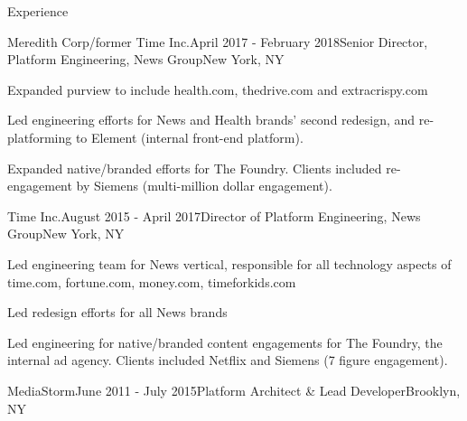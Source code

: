 \documentclass{resume} %
\begin{document}

\begin{rSection}{Experience}

\begin{rSubsection}{Meredith Corp/former Time Inc.}{April 2017 - February 2018}{Senior Director, Platform Engineering, News Group}{New York, NY}
\item Expanded purview to include health.com, thedrive.com and extracrispy.com
\item Led engineering efforts for News and Health brands' second redesign, and re-platforming to Element (internal front-end platform).
\item Expanded native/branded efforts for The Foundry. Clients included re-engagement by Siemens (multi-million dollar engagement).
\end{rSubsection}


\begin{rSubsection}{Time Inc.}{August 2015 - April 2017}{Director of Platform Engineering, News Group}{New York, NY}
\item Led engineering team for News vertical, responsible for all technology aspects of time.com, fortune.com, money.com, timeforkids.com
\item Led redesign efforts for all News brands
\item Led engineering for native/branded content engagements for The Foundry, the internal ad agency. Clients included Netflix and Siemens (7 figure engagement).
\end{rSubsection}


\begin{rSubsection}{MediaStorm}{June 2011 - July 2015}{Platform Architect \& Lead Developer}{Brooklyn, NY}


\end{rSubsection}
\end{rSection}
\end{document}
